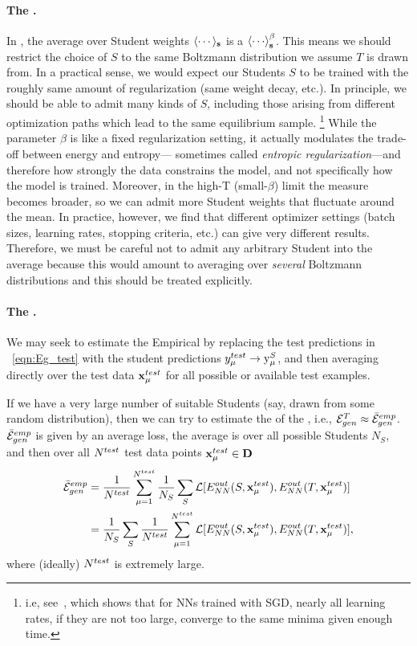 \paragraph{The \ThermalAverage.} 
In \STATMECH, the average over Student weights $\langle\cdots\rangle_{{\mathbf{s}}}$ is a \ThermalAverage $\THRMAVG{\cdots}$.  This means we should restrict the choice of $S$ to the same Boltzmann distribution we assume $T$ is drawn from.  
In a practical sense, we would expect our Students $S$ to be trained with the roughly same amount of regularization (same weight decay, etc.). In principle, we should be able to admit many kinds of $S$, including those arising from
different optimization paths which lead to the same equilibrium sample. 
\footnote{i.e, see~\cite{WILSON20031429}, which shows that for NNs trained with SGD, nearly all learning rates, if they are not too large, converge to the same minima given enough time.}
While the parameter $\beta$ is like a fixed regularization setting,
it actually modulates the trade-off between energy and entropy—
sometimes called \emph{entropic regularization}—and therefore how strongly the
data constrains the model, and not specifically how the model is trained.
Moreover, in the high-T (small-$\beta$) limit the
measure becomes broader, so we can admit more Student weights that fluctuate 
around the mean.
In practice, however, we find
that different optimizer settings (batch sizes, learning rates, stopping criteria, etc.)  can give very different results.   
Therefore, we must be careful not to admit any arbitrary Student into the average
because this would amount to averaging over \emph{several} Boltzmann distributions and this should
be treated explicitly.  


\paragraph{The \AverageGeneralizationError.}
We may seek to estimate the Empirical \AverageGeneralizationError
by replacing the test predictions in \EQN~\ref{eqn:Eg_test} with the student predictions
$y_{\mu}^{test}\rightarrow \mathrm{y}_{\mu}^{S}$, and then averaging directly over the test data $\mathbf{x}_{\mu}^{test}$
for all possible or available test examples.

If we have a very large number of suitable Students
(say, drawn from some random distribution), then we can try to estimate the 
\AverageGeneralizationError of the \Teacher, i.e., ${\mathcal{E}}_{gen}^{T}\approx\bar{\mathcal{E}}^{emp}_{gen}$.
$\bar{\mathcal{E}}^{emp}_{gen}$ is given by an average loss, the average is 
over all possible Students $N_S$,  and then  over all  $N^{test}$ test data points $\mathbf{x}_{\mu}^{test}\in\mathbf{D}$ 
\begin{align}
  \bar{\mathcal{E}}^{emp}_{gen}
  &=
  \frac{1}{N^{test}}\sum_{\mu=1}^{N^{test}}
  \frac{1}{N_S}\sum_{S}
  \mathcal{L}[E^{out}_{NN}(S,\mathbf{x}_{\mu}^{test}),E^{out}_{NN}(T,\mathbf{x}_{\mu}^{test})]  \\ \nonumber
    &=
  \frac{1}{N_S}\sum_{S}
    \frac{1}{N^{test}}\sum_{\mu=1}^{N^{test}}
    \mathcal{L}[E^{out}_{NN}(S,\mathbf{x}_{\mu}^{test}),E^{out}_{NN}(T,\mathbf{x}_{\mu}^{test})] ,
\label{eqn:emp_gen_error}
\end{align}
where (ideally) $N^{test}$ is extremely large.

